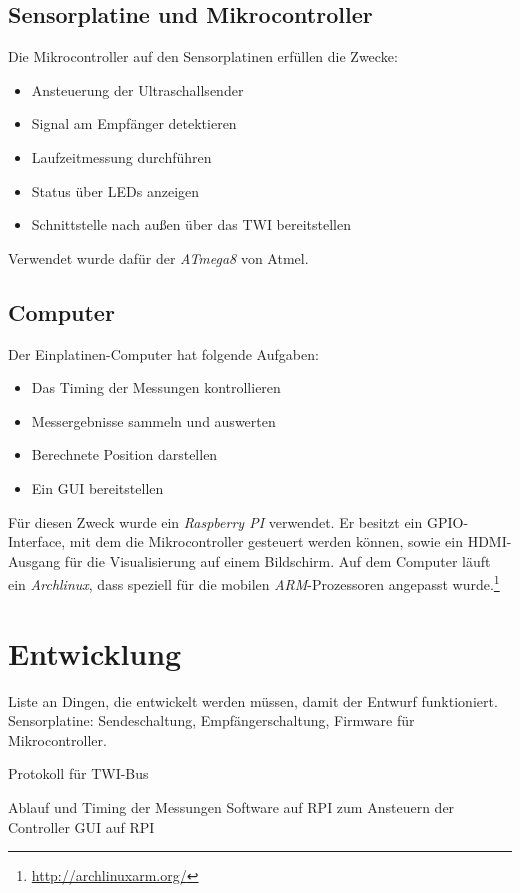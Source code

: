 \subsection{Sensorplatine und Mikrocontroller}
Die Mikrocontroller auf den Sensorplatinen erfüllen die Zwecke:
\begin{itemize}
	\item Ansteuerung der Ultraschallsender
	\item Signal am Empfänger detektieren
	\item Laufzeitmessung durchführen
	\item Status über \ac{LED}s anzeigen
	\item Schnittstelle nach außen über das \ac{TWI} bereitstellen
\end{itemize}
Verwendet wurde dafür der \textit{ATmega8} von Atmel.  %


\subsection{Computer}
Der Einplatinen-Computer hat folgende Aufgaben:
\begin{itemize}
	\item Das Timing der Messungen kontrollieren
	\item Messergebnisse sammeln und auswerten
	\item Berechnete Position darstellen
	\item Ein \ac{GUI} bereitstellen
\end{itemize}
Für diesen Zweck wurde ein \textit{Raspberry PI} verwendet. Er besitzt ein \ac{GPIO}-Interface, mit dem die Mikrocontroller gesteuert werden können, sowie ein \ac{HDMI}-Ausgang für die Visualisierung auf einem Bildschirm. Auf dem Computer läuft ein \textit{Archlinux}, dass speziell für die mobilen \textit{ARM}-Prozessoren angepasst wurde.\footnote{\url{http://archlinuxarm.org/}}



\section{Entwicklung} %
Liste an Dingen, die entwickelt werden müssen, damit der Entwurf funktioniert.
Sensorplatine:
Sendeschaltung,
Empfängerschaltung,
Firmware für Mikrocontroller.

Protokoll für TWI-Bus

Ablauf und Timing der Messungen
Software auf RPI zum Ansteuern der Controller
GUI auf RPI




